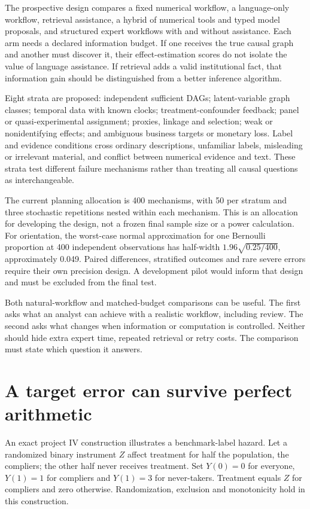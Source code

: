 The prospective design compares a fixed numerical workflow, a language-only
workflow, retrieval assistance, a hybrid of numerical tools and typed model
proposals, and structured expert workflows with and without assistance.
Each arm needs a declared information budget. If one receives the true
causal graph and another must discover it, their effect-estimation scores
do not isolate the value of language assistance. If retrieval adds a valid
institutional fact, that information gain should be distinguished from a
better inference algorithm.

Eight strata are proposed: independent sufficient DAGs; latent-variable
graph classes; temporal data with known clocks; treatment-confounder
feedback; panel or quasi-experimental assignment; proxies, linkage and
selection; weak or nonidentifying effects; and ambiguous business targets
or monetary loss. Label and evidence conditions cross ordinary descriptions,
unfamiliar labels, misleading or irrelevant material, and conflict between
numerical evidence and text. These strata test different failure mechanisms
rather than treating all causal questions as interchangeable.

The current planning allocation is 400 mechanisms, with 50 per stratum and
three stochastic repetitions nested within each mechanism. This is an
allocation for developing the design, not a frozen final sample size or a
power calculation. For orientation, the worst-case normal approximation for
one Bernoulli proportion at 400 independent observations has half-width
\(1.96\sqrt{0.25/400}\), approximately 0.049. Paired differences, stratified
outcomes and rare severe errors require their own precision design. A
development pilot would inform that design and must be excluded from the
final test.

Both natural-workflow and matched-budget comparisons can be useful. The
first asks what an analyst can achieve with a realistic workflow, including
review. The second asks what changes when information or computation is
controlled. Neither should hide extra expert time, repeated retrieval or
retry costs. The comparison must state which question it answers.

\section{A target error can survive perfect arithmetic}

An exact project IV construction illustrates a benchmark-label hazard.
Let a randomized binary instrument \(Z\) affect treatment for half the
population, the compliers; the other half never receives treatment. Set
\(Y(0)=0\) for everyone, \(Y(1)=1\) for compliers and \(Y(1)=3\) for
never-takers. Treatment equals \(Z\) for compliers and zero otherwise.
Randomization, exclusion and monotonicity hold in this construction.

